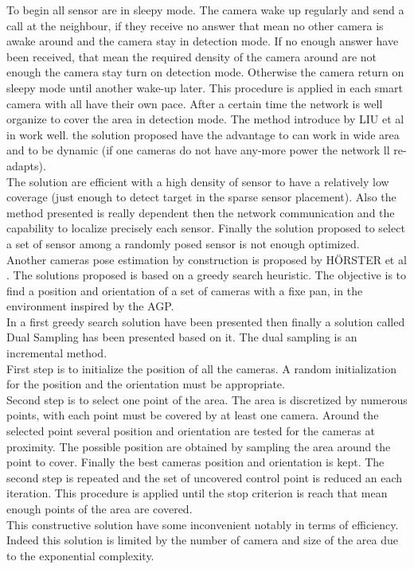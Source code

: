 To begin all sensor are in sleepy mode.  The camera wake up regularly and send a call at the neighbour, if they receive no answer that mean no other camera is awake around and the camera stay in detection mode. If no enough answer have been received, that mean the required density of the camera around are not enough the camera stay turn on detection mode. Otherwise the camera return on sleepy mode until another wake-up later. This procedure is applied in each smart camera with all have their own pace. After a certain time the network is well organize to cover the area in detection mode.
 The method introduce by LIU et al in \cite{38*liu2010} work well. the solution proposed have the advantage to can  work in wide area and to be dynamic (if one cameras do not have any-more power the network ll re-adapts).  \\
The solution are efficient  with a high density of sensor to have a relatively low coverage (just enough to detect target in the sparse sensor placement). Also the method presented is really dependent then the network communication and the capability to localize precisely each sensor. Finally the solution proposed to select a set of sensor among a randomly posed sensor is not enough optimized.\\

Another cameras pose estimation by construction is proposed by HÖRSTER et al \cite{171*horster2006}.
The solutions proposed is based on a greedy search heuristic.  The objective is to find a position and orientation of a set of cameras with a fixe pan, in the environment inspired by the AGP. \\
In \cite{171*horster2006} a first greedy search solution have been presented then finally a solution called Dual Sampling has been presented based on it.
The dual sampling is an incremental method. \\
First step is to initialize the position of all the cameras. A random initialization for the position and the orientation must be appropriate.  \\
Second step is to select one point of the area. The area is discretized by numerous points, with each point must be covered by at least one camera. Around the selected point several position and orientation are tested for the cameras at proximity. The possible position are obtained by sampling the area around the point to cover. Finally the best cameras position and orientation is kept.
The second step is repeated and the set of uncovered control point is reduced an each iteration.  This procedure is applied until the stop criterion is reach that mean enough points of the area are covered. \\
This constructive solution have some inconvenient notably in terms of efficiency. Indeed this solution is limited by the number of camera and size of the area due to the exponential complexity.\\

